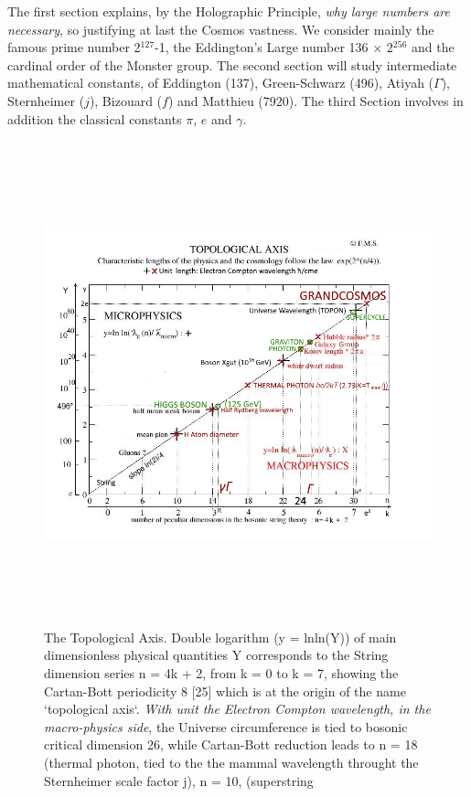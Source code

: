 \documentclass[twoside,draft]{article}
\begin{document}
\begin{sloppypar}
{The first section explains, by the Holographic Principle, \textit{why large numbers are necessary}, so justifying at last the Cosmos vastness. We consider mainly the famous prime number 2$^{127}\!$-1, the Eddington's Large number 136 $\times$ 2$^{256}\!$ and the cardinal order of the Monster group. The second section will study intermediate mathematical constants, of Eddington (137), Green-Schwarz (496), Atiyah ($\Gamma$), Sternheimer ($j$), Bizouard ($f$) and Matthieu (7920). The third Section involves in addition the classical constants $\pi$, $e$ and $\gamma$. 



\begin{figure}
\centering
\includegraphics[width=\textwidth,height=14cm]{./figures/figure}
\caption{The Topological Axis. Double logarithm (y = lnln(Y)) of main dimensionless physical quantities 
Y corresponds to the String dimension series n = 4k + 2, from k = 0 to k = 7, showing the Cartan-Bott
periodicity 8 [25] which is at the origin of the name `topological axis`. 
\textit{With unit the Electron Compton wavelength, in the macro-physics side}, the Universe circumference 
    is tied to bosonic critical dimension 26, while Cartan-Bott reduction leads to n = 18 (thermal photon, 
    tied to the the mammal wavelength throught the Sternheimer scale factor j), n = 10, (superstring 
}
\end{figure}}
\end{sloppypar}
\end{document}
